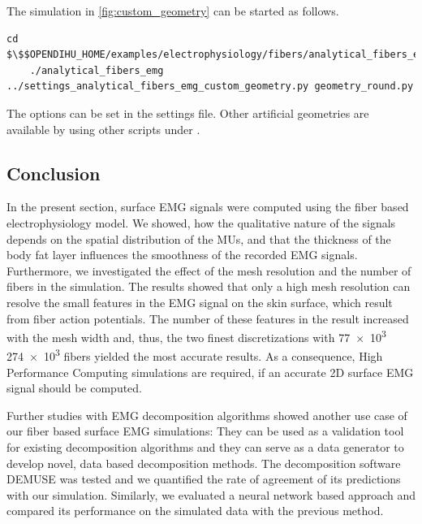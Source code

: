 \begin{reproduce_no_break}
  The simulation in \cref{fig:custom_geometry} can be started as follows.
  \begin{lstlisting}[columns=fullflexible,breaklines=true,postbreak=\mbox{\textcolor{gray}{$\hookrightarrow$}\space}]
    cd $\$$OPENDIHU_HOME/examples/electrophysiology/fibers/analytical_fibers_emg/build_release
    ./analytical_fibers_emg ../settings_analytical_fibers_emg_custom_geometry.py geometry_round.py
  \end{lstlisting}
  The options can be set in the  settings file. Other artificial geometries are available by using other scripts under .
\end{reproduce_no_break}

\subsection{Conclusion}

In the present section, surface EMG signals were computed using the fiber based electrophysiology model. We showed, how the qualitative nature of the signals depends on the spatial distribution of the MUs, and that the thickness of the body fat layer influences the smoothness of the recorded EMG signals. Furthermore, we investigated the effect of the mesh resolution and the number of fibers in the simulation. The results showed that only a high mesh resolution can resolve the small features in the EMG signal  on the skin surface, which result from fiber action potentials. The number of these features in the result increased with the mesh width and, thus, the two finest discretizations with \num{77e3} \num{274e3} fibers yielded the most accurate results. As a consequence, High Performance Computing simulations are required, if an accurate 2D surface EMG signal should be computed.

Further studies with EMG decomposition algorithms showed another use case of our fiber based surface EMG simulations: They can be used as a validation tool for existing decomposition algorithms and they can serve as a data generator to develop novel, data based decomposition methods. The decomposition software DEMUSE was tested and we quantified the rate of agreement of its predictions with our simulation. Similarly, we evaluated a neural network based approach and compared its performance on the simulated data with the previous method.

